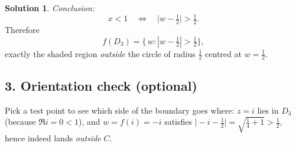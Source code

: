 \documentclass[12pt]{article}
\theoremstyle{definition} %
\newtheorem{solution}{Solution}
\theoremstyle{plain} %
\begin{document}
\begin{solution}
      \medskip
      \noindent
      \emph{Conclusion:}
      \[
            x<1
            \quad\Longleftrightarrow\quad
            \bigl|w-\tfrac12\bigr|>\tfrac12 .
      \]
      Therefore
      \[
         f(D_{3})
           =\{\,w:|w-\tfrac12|>\tfrac12\},
      \]
      exactly the shaded region \emph{outside} the circle of radius
      \(\tfrac12\) centred at \(w=\tfrac12\).
      
      \subsection*{3.  Orientation check (optional)}
      
      Pick a test point to see which side of the boundary goes where:  
      \(z=i\) lies in \(D_{3}\) (because \(\Re i=0<1\)), and
      \(w=f(i)=-i\) satisfies
      \(\bigl|-i-\tfrac12\bigr|=\sqrt{\tfrac14+1}>\tfrac12\),
      hence indeed lands \emph{outside} \(C\).
      
      \end{solution}
      \pagebreak
\end{document}
